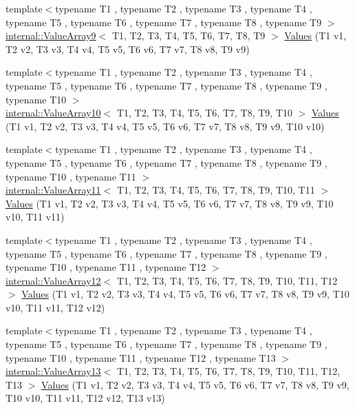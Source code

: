\begin{DoxyCompactItemize}
{\footnotesize template$<$typename T1 , typename T2 , typename T3 , typename T4 , typename T5 , typename T6 , typename T7 , typename T8 , typename T9 $>$ }\\\mbox{\hyperlink{classtesting_1_1internal_1_1ValueArray9}{internal\+::\+Value\+Array9}}$<$ T1, T2, T3, T4, T5, T6, T7, T8, T9 $>$ \mbox{\hyperlink{namespacetesting_ab663e13807ad5cc223814797c9191a58}{Values}} (T1 v1, T2 v2, T3 v3, T4 v4, T5 v5, T6 v6, T7 v7, T8 v8, T9 v9)
\item 
{\footnotesize template$<$typename T1 , typename T2 , typename T3 , typename T4 , typename T5 , typename T6 , typename T7 , typename T8 , typename T9 , typename T10 $>$ }\\\mbox{\hyperlink{classtesting_1_1internal_1_1ValueArray10}{internal\+::\+Value\+Array10}}$<$ T1, T2, T3, T4, T5, T6, T7, T8, T9, T10 $>$ \mbox{\hyperlink{namespacetesting_a2948b0215fce80155fdbad4e3608f4cd}{Values}} (T1 v1, T2 v2, T3 v3, T4 v4, T5 v5, T6 v6, T7 v7, T8 v8, T9 v9, T10 v10)
\item 
{\footnotesize template$<$typename T1 , typename T2 , typename T3 , typename T4 , typename T5 , typename T6 , typename T7 , typename T8 , typename T9 , typename T10 , typename T11 $>$ }\\\mbox{\hyperlink{classtesting_1_1internal_1_1ValueArray11}{internal\+::\+Value\+Array11}}$<$ T1, T2, T3, T4, T5, T6, T7, T8, T9, T10, T11 $>$ \mbox{\hyperlink{namespacetesting_a4aaae77b8404038ed5f3bf56cccdb940}{Values}} (T1 v1, T2 v2, T3 v3, T4 v4, T5 v5, T6 v6, T7 v7, T8 v8, T9 v9, T10 v10, T11 v11)
\item 
{\footnotesize template$<$typename T1 , typename T2 , typename T3 , typename T4 , typename T5 , typename T6 , typename T7 , typename T8 , typename T9 , typename T10 , typename T11 , typename T12 $>$ }\\\mbox{\hyperlink{classtesting_1_1internal_1_1ValueArray12}{internal\+::\+Value\+Array12}}$<$ T1, T2, T3, T4, T5, T6, T7, T8, T9, T10, T11, T12 $>$ \mbox{\hyperlink{namespacetesting_a03e7f9611794732bb030c53365dc6c86}{Values}} (T1 v1, T2 v2, T3 v3, T4 v4, T5 v5, T6 v6, T7 v7, T8 v8, T9 v9, T10 v10, T11 v11, T12 v12)
\item 
{\footnotesize template$<$typename T1 , typename T2 , typename T3 , typename T4 , typename T5 , typename T6 , typename T7 , typename T8 , typename T9 , typename T10 , typename T11 , typename T12 , typename T13 $>$ }\\\mbox{\hyperlink{classtesting_1_1internal_1_1ValueArray13}{internal\+::\+Value\+Array13}}$<$ T1, T2, T3, T4, T5, T6, T7, T8, T9, T10, T11, T12, T13 $>$ \mbox{\hyperlink{namespacetesting_aa13a09e043383c947042ba726d25d47c}{Values}} (T1 v1, T2 v2, T3 v3, T4 v4, T5 v5, T6 v6, T7 v7, T8 v8, T9 v9, T10 v10, T11 v11, T12 v12, T13 v13)

\end{DoxyCompactItemize}
